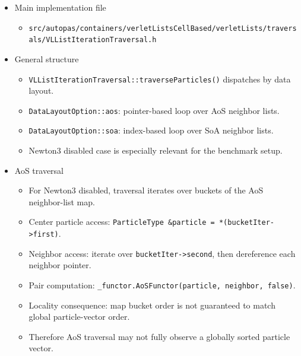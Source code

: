 \begin{itemize}
    \item Main implementation file
    \begin{itemize}
        \item \texttt{src/autopas/containers/verletListsCellBased/verletLists/traversals/VLListIterationTraversal.h}
    \end{itemize}

    \item General structure
    \begin{itemize}
        \item \texttt{VLListIterationTraversal::traverseParticles()} dispatches by data layout.
        \item \texttt{DataLayoutOption::aos}: pointer-based loop over AoS neighbor lists.
        \item \texttt{DataLayoutOption::soa}: index-based loop over SoA neighbor lists.
        \item Newton3 disabled case is especially relevant for the benchmark setup.
    \end{itemize}

    \item AoS traversal
    \begin{itemize}
        \item For Newton3 disabled, traversal iterates over buckets of the AoS neighbor-list map.
        \item Center particle access: \texttt{ParticleType \&particle = *(bucketIter->first)}.
        \item Neighbor access: iterate over \texttt{bucketIter->second}, then dereference each neighbor pointer.
        \item Pair computation: \texttt{\_functor.AoSFunctor(particle, neighbor, false)}.
        \item Locality consequence: map bucket order is not guaranteed to match global particle-vector order.
        \item Therefore AoS traversal may not fully observe a globally sorted particle vector.
    \end{itemize}


\end{itemize}
